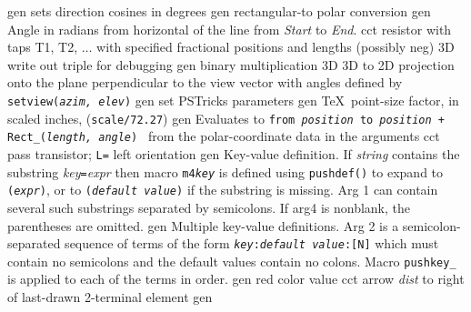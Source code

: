   {gen}
  {sets direction cosines in degrees }
  {gen}
  {rectangular-to polar conversion}
  {gen}
  {Angle in radians from horizontal of the line from {\sl Start}
  to {\sl End}.}
 {cct}
  {resistor with taps T1, T2, $\ldots$
    with specified fractional positions and lengths (possibly neg)
   }
  {3D} {write out triple for debugging}
  {gen}
  {binary multiplication}
  {3D} {3D to 2D projection onto the plane perpendicular to the view
  vector with
   angles defined by {\tt setview({\sl azim, elev})}}
  {gen}
  {set PSTricks parameters}
  {gen}
  {\TeX\ point-size factor, in scaled inches, ({\tt *scale/72.27})}
  {gen}
  {Evaluates to {\tt from {\sl position} to
   {\sl position} + Rect\_({\sl length, angle}) }
   from the polar-coordinate data in the arguments }
  {cct}
  {pass transistor; {\tt L=} left orientation
    }
  {gen}
  {Key-value definition.
  If {\sl string} contains the substring
  {\sl key}{\tt =}{\sl expr} then macro {\tt m4{\sl key}}
  is defined using {\tt pushdef()} to
  expand to {\tt ({\sl expr})}, or to {\tt ({\sl default value})} if the
  substring is missing.  Arg 1 can contain several such substrings separated
  by semicolons.
  If arg4 is nonblank, the parentheses are omitted.
   }
  {gen}
  {Multiple key-value definitions. Arg 2 is a semicolon-separated
   sequence of terms of the form {\tt {\sl key}:{\sl default value}:[N]}
   which must contain no semicolons and the default values contain no colons.
   Macro {\tt pushkey\_} is applied to each of the terms in order.
   }
%
  {gen}
  {red color value}
  {cct}
  {arrow {\sl dist} to right of last-drawn 2-terminal element
   }
  {gen}

